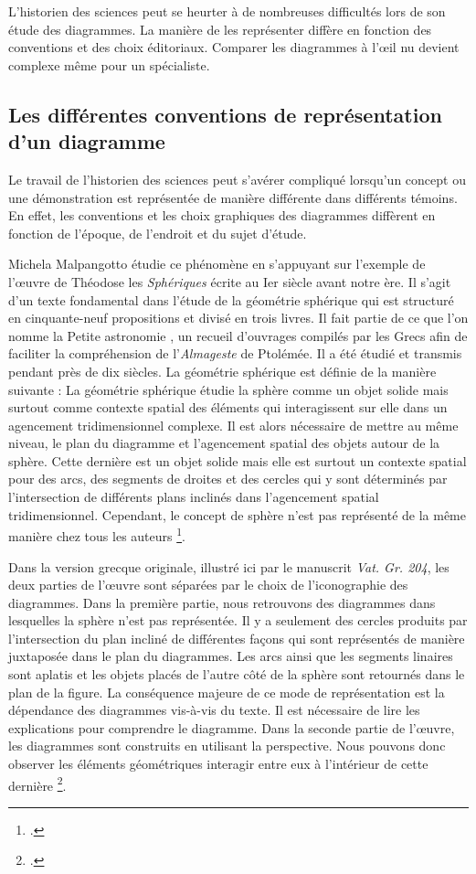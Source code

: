 L'historien des sciences peut se heurter à de nombreuses difficultés lors de son étude des diagrammes. La manière de les représenter diffère en fonction des conventions et des choix éditoriaux. Comparer les diagrammes à l'œil nu devient complexe même pour un spécialiste.

\subsection{Les différentes conventions de représentation d'un diagramme}

Le travail de l'historien des sciences peut s'avérer compliqué lorsqu'un concept ou une démonstration est représentée de manière différente dans différents témoins. En effet, les conventions et les choix graphiques des diagrammes diffèrent en fonction de l'époque, de l'endroit et du sujet d'étude.

Michela Malpangotto étudie ce phénomène en s'appuyant sur l'exemple de l'œuvre de Théodose les \textit{Sphériques} écrite au Ier siècle avant notre ère. Il s'agit d'un texte fondamental dans l'étude de la géométrie sphérique qui est structuré en cinquante-neuf propositions et divisé en trois livres. Il fait partie de ce que l'on nomme la \og Petite astronomie \fg, un recueil d'ouvrages compilés par les Grecs afin de faciliter la compréhension de l'\textit{Almageste} de Ptolémée. Il a été étudié et transmis pendant près de dix siècles. La géométrie sphérique est définie de la manière suivante : \og La géométrie sphérique étudie la sphère comme un objet solide mais surtout comme contexte spatial des éléments qui interagissent sur elle dans un agencement tridimensionnel complexe. \fg Il est alors nécessaire de mettre au même niveau, le plan du diagramme et l'agencement spatial des objets autour de la sphère. Cette dernière est un objet solide mais elle est surtout un contexte spatial pour des arcs, des segments de droites et des cercles qui y sont déterminés par l'intersection de différents plans inclinés dans l'agencement spatial tridimensionnel. Cependant, le concept de sphère n'est pas représenté de la même manière chez tous les auteurs \footcite{malpangottoGraphicalChoicesGeometrical2010}.

Dans la version grecque originale, illustré ici par le manuscrit \textit{Vat. Gr. 204}, les deux parties de l'œuvre sont séparées par le choix de l'iconographie des diagrammes. Dans la première partie, nous retrouvons des diagrammes dans lesquelles la sphère n'est pas représentée. Il y a seulement des cercles produits par l'intersection du plan incliné de différentes façons qui sont représentés de manière juxtaposée dans le plan du diagrammes. Les arcs ainsi que les segments linaires sont aplatis et les objets placés de l'autre côté de la sphère sont retournés dans le plan de la figure. La conséquence majeure de ce mode de représentation est la dépendance des diagrammes vis-à-vis du texte. Il est nécessaire de lire les explications pour comprendre le diagramme. Dans la seconde partie de l'œuvre, les diagrammes sont construits en utilisant la perspective. Nous pouvons donc observer les éléments géométriques interagir entre eux à l'intérieur de cette dernière \footcite{malpangottoGraphicalChoicesGeometrical2010}.

